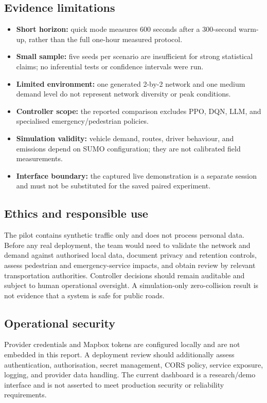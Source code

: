 \documentclass[11pt,a4paper]{article}
\begin{document}
\subsection{Evidence limitations}
\begin{itemize}
  \item \textbf{Short horizon:} quick mode measures 600 seconds after a 300-second
  warm-up, rather than the full one-hour measured protocol.
  \item \textbf{Small sample:} five seeds per scenario are insufficient for strong
  statistical claims; no inferential tests or confidence intervals were run.
  \item \textbf{Limited environment:} one generated 2-by-2 network and one medium
  demand level do not represent network diversity or peak conditions.
  \item \textbf{Controller scope:} the reported comparison excludes PPO, DQN, LLM, and
  specialised emergency/pedestrian policies.
  \item \textbf{Simulation validity:} vehicle demand, routes, driver behaviour, and
  emissions depend on SUMO configuration; they are not calibrated field measurements.
  \item \textbf{Interface boundary:} the captured live demonstration is a separate
  session and must not be substituted for the saved paired experiment.
\end{itemize}

\subsection{Ethics and responsible use}
The pilot contains synthetic traffic only and does not process personal data. Before
any real deployment, the team would need to validate the network and demand against
authorised local data, document privacy and retention controls, assess pedestrian and
emergency-service impacts, and obtain review by relevant transportation authorities.
Controller decisions should remain auditable and subject to human operational
oversight. A simulation-only zero-collision result is not evidence that a system is
safe for public roads.

\subsection{Operational security}
Provider credentials and Mapbox tokens are configured locally and are not embedded
in this report. A deployment review should additionally assess authentication,
authorisation, secret management, CORS policy, service exposure, logging, and
provider data handling. The current dashboard is a research/demo interface and is
not asserted to meet production security or reliability requirements.
\end{document}

